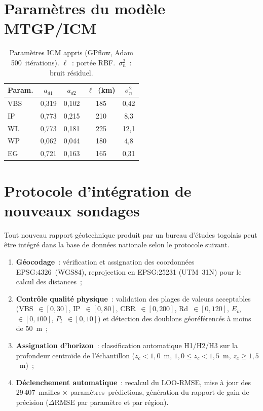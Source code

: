 \documentclass[10pt,a4paper,twocolumn]{article}
\begin{document}
	\section{Paramètres du modèle MTGP/ICM}
	\label{app:mtgp}
	
	\begin{table}[H]
		\centering\small
		\caption{Paramètres ICM appris (GPflow, Adam 500~itérations).
			$\ell$~: portée RBF.~$\sigma^2_n$~: bruit résiduel.}
		\label{tab:mtgp_params}
		\begin{tabular}{lcccc}
			\toprule
			Param. & $a_{d1}$ & $a_{d2}$ & $\ell$~(km) & $\sigma^2_n$ \\
			\midrule
			VBS & 0,319 & 0,102 & 185 & 0,42 \\
			IP  & 0,773 & 0,215 & 210 & 8,3  \\
			WL  & 0,773 & 0,181 & 225 & 12,1 \\
			WP  & 0,062 & 0,044 & 180 & 4,8  \\
			EG  & 0,721 & 0,163 & 165 & 0,31 \\
			\bottomrule
		\end{tabular}
	\end{table}
	
	\section{Protocole d'intégration de nouveaux sondages}
	\label{app:protocole}

	Tout nouveau rapport géotechnique produit par un bureau d'études
	togolais peut être intégré dans la base de données nationale selon
	le protocole suivant.

	\begin{enumerate}[label=\arabic*.,topsep=4pt]
		\item \textbf{Géocodage}~: vérification et assignation des
		coordonnées EPSG:4326~(WGS84), reprojection en EPSG:25231
		(UTM~31N) pour le calcul des distances~;

		\item \textbf{Contrôle qualité physique}~: validation des
		plages de valeurs acceptables
		(VBS~$\in[0,30]$, IP~$\in[0,80]$, CBR~$\in[0,200]$,
		Rd~$\in[0,120]$, $E_m$~$\in[0,100]$, $P_l$~$\in[0,10]$)
		et détection des doublons géoréférencés
		à moins de 50~m~;

		\item \textbf{Assignation d'horizon}~: classification
		automatique H1/H2/H3 sur la profondeur centroïde de
		l'échantillon ($z_c < 1{,}0$~m, $1{,}0 \leq z_c < 1{,}5$~m,
		$z_c \geq 1{,}5$~m)~;

		\item \textbf{Déclenchement automatique}~: recalcul du
		LOO-RMSE, mise à jour des 29\,407~mailles $\times$ paramètres~prédictions, génération du
		rapport de gain de précision ($\Delta\mathrm{RMSE}$ par
		paramètre et par région).
	\end{enumerate}
\end{document}
